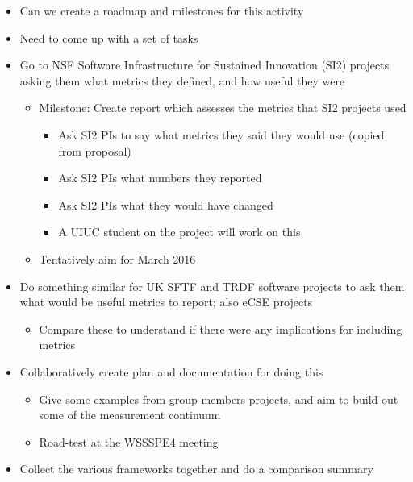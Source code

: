 \begin{itemize}
\item
Can we create a roadmap and milestones for this activity

\item
Need to come up with a set of tasks

\item
Go to NSF Software Infrastructure for Sustained Innovation (SI2) projects asking them what metrics they defined, and how useful they were

\begin{itemize}
\item
        Milestone: Create report which assesses the metrics that SI2 projects used

\begin{itemize}
\item
                Ask SI2 PIs to say what metrics they said they would use (copied from proposal)

\item
                Ask SI2 PIs what numbers they reported

\item
                Ask SI2 PIs what they would have changed

\item
                A UIUC student on the project will work on this
\end{itemize}

\item
        Tentatively aim for March 2016
\end{itemize}

\item
Do something similar for UK SFTF and TRDF software projects to ask them what would be useful metrics to report; also eCSE projects

\begin{itemize}
\item
        Compare these to understand if there were any implications for including metrics
\end{itemize}

\item
Collaboratively create plan and documentation for doing this

\begin{itemize}
\item
        Give some examples from group members projects, and aim to build out some of the measurement continuum

\item
        Road-test at the WSSSPE4 meeting
\end{itemize}

\item
Collect the various frameworks together and do a comparison summary

\end{itemize}

